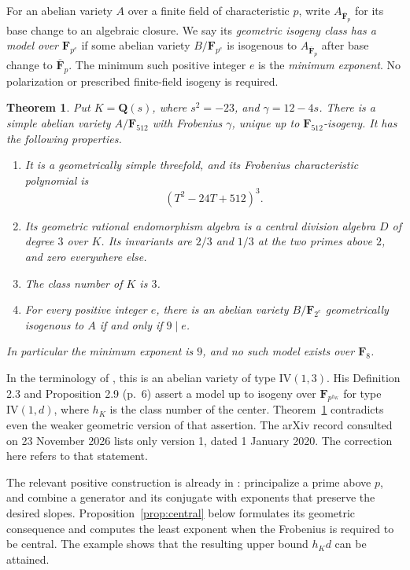 \documentclass[11pt,a4paper]{article}
\newcommand{\Q}{\mathbf Q}
\newcommand{\F}{\mathbf F}
\newtheorem{theorem}{Theorem}[section]
\theoremstyle{definition}
\theoremstyle{remark}
\begin{document}
For an abelian variety $A$ over a finite field of characteristic $p$,
write $A_{\overline{\F}_p}$ for its base change to an algebraic closure.
We say its \emph{geometric isogeny class has a model over $\F_{p^e}$}
if some abelian variety $B/\F_{p^e}$ is isogenous to
$A_{\overline{\F}_p}$ after base change to $\overline{\F}_p$.
The minimum such positive integer $e$ is the \emph{minimum exponent}.
No polarization or prescribed finite-field isogeny is required.

\begin{theorem}\label{thm:main}
Put $K=\Q(s)$, where $s^2=-23$, and $\gamma=12-4s$.
There is a simple abelian variety $A/\F_{512}$ with Frobenius
$\gamma$, unique up to $\F_{512}$-isogeny. It has the following
properties.
\begin{enumerate}
\item It is a geometrically simple threefold, and its Frobenius
characteristic polynomial is
\[
                 (T^2-24T+512)^3.
\]
\item Its geometric rational endomorphism algebra is a central
division algebra $D$ of degree $3$ over $K$. Its invariants are
$2/3$ and $1/3$ at the two primes above $2$, and zero everywhere else.
\item The class number of $K$ is $3$.
\item For every positive integer $e$, there is an abelian variety
$B/\F_{2^e}$ geometrically isogenous to $A$ if and only if $9\mid e$.
\end{enumerate}
In particular the minimum exponent is $9$, and no such model exists
over $\F_8$.
\end{theorem}

In the terminology of \citet[Definition 2.1, p.~3]{Thakur2020}, this
is an abelian variety of type $\mathrm{IV}(1,3)$.
His Definition 2.3 and Proposition 2.9 (p.~6) assert a model up to
isogeny over $\F_{p^{h_K}}$ for type $\mathrm{IV}(1,d)$, where
$h_K$ is the class number of the center. Theorem~\ref{thm:main}
contradicts even the weaker geometric version of that assertion.
The arXiv record consulted on 23 November 2026 lists only version 1,
dated 1 January 2020. The correction here refers to that statement.

The relevant positive construction is already in
\citet[Proposition 2.4, pp.~4--5]{Thakur2020}: principalize a prime
above $p$, and combine a generator and its conjugate with exponents
that preserve the desired slopes. Proposition~\ref{prop:central}
below formulates its geometric consequence and computes the least
exponent when the Frobenius is required to be central. The example
shows that the resulting upper bound $h_Kd$ can be attained.
\end{document}

